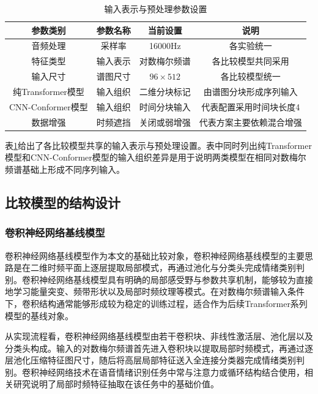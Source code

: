 \begin{table}[!htbp]
    \centering
    \caption{输入表示与预处理参数设置}
    \label{tab:chapter4_preprocess}
    \begin{tabular}{cccc}
        \toprule
        参数类别 & 参数名称 & 当前设置 & 说明 \\
        \midrule
        音频处理 & 采样率 & 16000Hz & 各实验统一 \\
        特征类型 & 输入表示 & 对数梅尔频谱 & 各比较模型共同采用 \\
        输入尺寸 & 谱图尺寸 & $96 \times 512$ & 各比较模型统一 \\
        纯Transformer模型 & 输入组织 & 二维分块标记 & 由谱图分块形成序列输入 \\
        CNN-Conformer模型 & 输入组织 & 时间分块输入 & 代表配置采用时间块长度4 \\
        数据增强 & 时频遮挡 & 关闭或弱增强 & 代表方案主要依赖混合增强 \\
        \bottomrule
    \end{tabular}
\end{table}

表\ref{tab:chapter4_preprocess}给出了各比较模型共享的输入表示与预处理设置。表中同时列出纯Transformer模型和CNN-Conformer模型的输入组织差异是用于说明两类模型在相同对数梅尔频谱基础上形成不同序列输入。

\subsection{比较模型的结构设计}

\subsubsection{卷积神经网络基线模型}

卷积神经网络基线模型作为本文的基础比较对象，卷积神经网络基线模型的主要思路是在二维时频平面上逐层提取局部模式，再通过池化与分类头完成情绪类别判别。卷积神经网络基线模型具有明确的局部感受野与参数共享机制，能够较为直接地学习能量突变、频带形状以及局部时频纹理等模式。在对数梅尔频谱输入条件下，卷积结构通常能够形成较为稳定的训练过程，适合作为后续Transformer系列模型的基线对象\cite{peng2021efficient,zhang2023cnn}。

从实现流程看，卷积神经网络基线模型由若干卷积块、非线性激活层、池化层以及分类头构成。输入的对数梅尔频谱首先进入卷积块以提取局部时频模式，再通过逐层池化压缩特征图尺寸，随后将高层局部特征送入全连接分类器完成情绪类别判别。卷积神经网络技术在语音情绪识别任务中常与注意力或循环结构结合使用，相关研究说明了局部时频特征抽取在该任务中的基础价值\cite{peng2021efficient,zhang2023cnn}。

